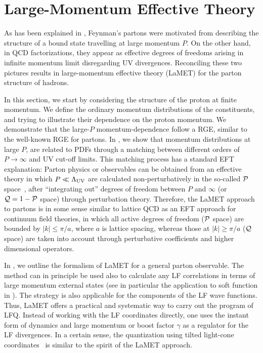 \section{Large-Momentum Effective Theory}
\label{sec:lamet}
As has been explained in , Feynman's partons
were motivated from describing the structure of a bound state
travelling at large momentum $P$. On the other hand, in QCD
factorizations, they appear as effective degrees of freedoms
arising in infinite momentum limit disregarding UV divergences.
Reconciling these two pictures results in large-momentum
effective theory (LaMET) for the parton structure of hadrons.

In this section, we start by considering the structure
of the proton at finite momentum. We define the
ordinary momentum distributions of the constituents,
and trying to illustrate their dependence on
the proton momentum. We demonstrate that the large-$P$ momentum-dependence
follow a RGE, similar to the
well-known RGE for partons. In ,
we show that momentum distributions at large $P$,
are related to PDFs through a matching between different orders of
$P\to \infty$ and UV cut-off limits. This matching process has a standard EFT
explanation: Parton physics or observables
can be obtained from an effective theory in which
$P\ll \Lambda_{\rm UV}$ are calculated non-perturbatively in the so-called ${\cal P}$ space~\cite{Messiah:1979eg},
after ``integrating out'' degrees of freedom between $P$ and $\infty$  (or ${\cal Q}=1-{\cal P}$ space)
through perturbation theory. Therefore, the LaMET approach to partons
is in some sense similar to lattice QCD  as an EFT approach for continuum field theories,
in which all active degrees of freedom (${\cal P}$ space) are bounded by $|k| \le \pi/a$,
where $a$ is lattice spacing, whereas those at $|k| \ge \pi/a$ (${\cal Q}$ space) are taken into account through
perturbative coefficients and higher dimensional operators.

In , we outline the formalism
of LaMET for a general parton observable. The method
can in principle be used also to calculate any LF
correlations in terms of large momentum external states (see in particular the application to
soft function in ).
The strategy is also applicable for the components of the LF wave functions.
Thus, LaMET offers a practical and systematic way to carry out the program of
LFQ. Instead of working with the LF coordinates directly, one uses the
instant form of dynamics and large momentum or boost factor $\gamma$ as a
regulator for the LF divergences. In a certain sense, the
quantization using tilted light-cone coordinates~\cite{Lenz:1991sa} is
similar to the spirit of the LaMET approach.

